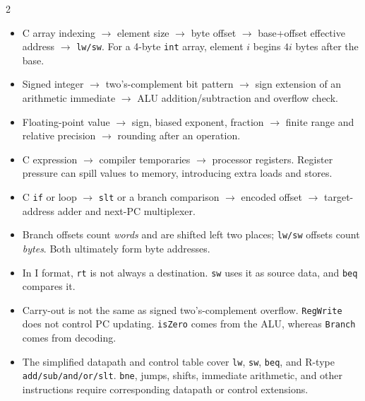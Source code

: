 \documentclass[a4paper,landscape]{article}
\begin{document}
\begin{multicols}{2}
\begin{itemize}
\item C array indexing \(\rightarrow\) element size
\(\rightarrow\) byte offset \(\rightarrow\) base+offset effective
address \(\rightarrow\) \texttt{lw/sw}. For a 4-byte \texttt{int}
array, element \(i\) begins \(4i\) bytes after the base.
\item Signed integer \(\rightarrow\) two's-complement bit pattern
\(\rightarrow\) sign extension of an arithmetic immediate
\(\rightarrow\) ALU addition/subtraction and overflow check.
\item Floating-point value \(\rightarrow\) sign, biased exponent,
fraction \(\rightarrow\) finite range and relative precision
\(\rightarrow\) rounding after an operation.
\item C expression \(\rightarrow\) compiler temporaries
\(\rightarrow\) processor registers. Register pressure can spill
values to memory, introducing extra loads and stores.
\item C \texttt{if} or loop \(\rightarrow\) \texttt{slt} or a
branch comparison \(\rightarrow\) encoded offset \(\rightarrow\)
target-address adder and next-PC multiplexer.
\item Branch offsets count \emph{words} and are shifted left two
places; \texttt{lw/sw} offsets count \emph{bytes}. Both ultimately
form byte addresses.
\item In I format, \texttt{rt} is not always a destination.
\texttt{sw} uses it as source data, and \texttt{beq} compares it.
\item Carry-out is not the same as signed two's-complement overflow.
\texttt{RegWrite} does not control PC updating. \texttt{isZero}
comes from the ALU, whereas \texttt{Branch} comes from decoding.
\item The simplified datapath and control table cover \texttt{lw},
\texttt{sw}, \texttt{beq}, and R-type \texttt{add/sub/and/or/slt}.
\texttt{bne}, jumps, shifts, immediate arithmetic, and other
instructions require corresponding datapath or control extensions.
\end{itemize}

\end{multicols}
\end{document}
